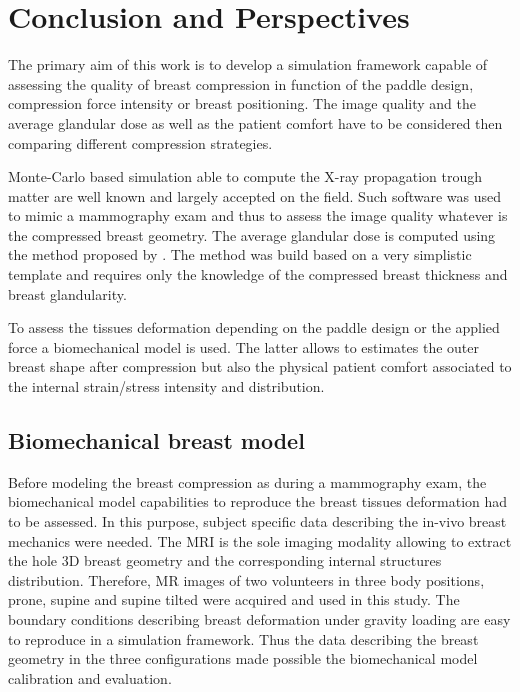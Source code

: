 
\chapter*{Conclusion and Perspectives}\label{section:generalconclusion}


The primary aim of this work is to develop a simulation framework capable of assessing the quality of breast compression in function of the paddle design, compression force intensity or breast positioning. The image quality and the average glandular dose as well as the patient comfort have to be considered then comparing different compression strategies.

 Monte-Carlo based simulation able to compute the X-ray propagation trough matter are well known and largely accepted on the field. Such software was used to mimic a mammography exam and thus to assess the image quality whatever is the compressed breast geometry. The average glandular dose is computed using the method proposed by \citep{dance_additional_2000}. The method was build based on a very simplistic template and requires only the knowledge of the compressed breast thickness and breast glandularity. 
 
 To assess the tissues deformation depending on the paddle design or the applied force a biomechanical model is used. The latter allows to estimates the outer breast shape after compression but also the physical patient comfort associated to the internal strain/stress intensity and distribution.
  
 \section{Biomechanical breast model }
  Before modeling the breast compression as during a mammography exam, the biomechanical model capabilities to reproduce the breast tissues deformation had to be assessed. In this  purpose, subject specific data describing the in-vivo breast mechanics were needed. The MRI is the sole imaging modality allowing to extract the hole 3D breast geometry and the corresponding internal structures distribution.  Therefore, MR images of two volunteers in three body positions, prone, supine and supine tilted were acquired and used in this study. The boundary conditions describing breast deformation under gravity loading are easy to reproduce in a simulation framework. Thus the data describing the breast geometry in the three configurations made possible the biomechanical model calibration and evaluation.
  

